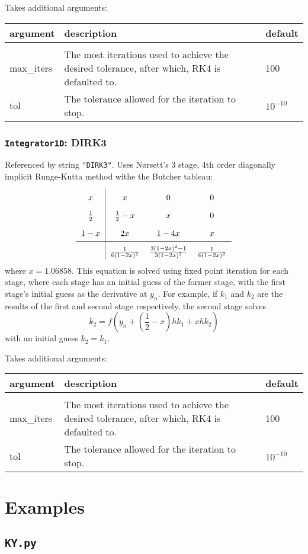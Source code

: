 \documentclass[10pt,a4paper]{article}
\newenvironment{optarglist}
    {\begin{center}
    \begin{tabular}{l|p{10cm}|l}
    argument & description & default\\
    \hline\\
    }
    { 
    \end{tabular} 
    \end{center}
    }
\begin{document}
Takes additional arguments:

\begin{optarglist}
max\_iters & The most iterations used to achieve the desired tolerance, after which, RK4 is defaulted to. & 100\\\hline
tol & The tolerance allowed for the iteration to stop. & $10^{-10}$
\end{optarglist}




\subsubsection{\texttt{Integrator1D}: DIRK3}
Referenced by string \texttt{"DIRK3"}. Uses Nørsett's 3 stage, 4th order diagonally implicit Runge-Kutta method withe the Butcher tableau:
\[\arraycolsep=6pt\def\arraystretch{1.8}\begin{array}{c|ccc}
x & x & 0 & 0\\
\frac12 & \frac12-x & x & 0\\
1-x & 2x & 1 - 4x & x\\
\hline
&\frac{1}{6(1-2x)^2} & \frac{3(1-2x)^2-1}{3(1-2x)^2} & \frac1{6(1-2x)^2}
\end{array}
\]
where $x = 1.06858$.
This equation is solved using fixed point iteration for each stage, where each stage has an initial guess of the former stage, with the first stage's initial guess as the derivative at $y_n$. For example, if $k_1$ and $k_2$ are the results of the first and second stage respectively, the second stage solves
$$k_2 = f\left(y_{n} + \left(\frac{1}{2}-x\right)hk_1 + xhk_2\right)$$
with an initial guess $k_2 = k_1$.

Takes additional arguments:

\begin{optarglist}
max\_iters & The most iterations used to achieve the desired tolerance, after which, RK4 is defaulted to. & 100\\\hline
tol & The tolerance allowed for the iteration to stop. & $10^{-10}$
\end{optarglist}





\pagebreak

\section{Examples}

\subsection{\texttt{KY.py}}
\end{document}

